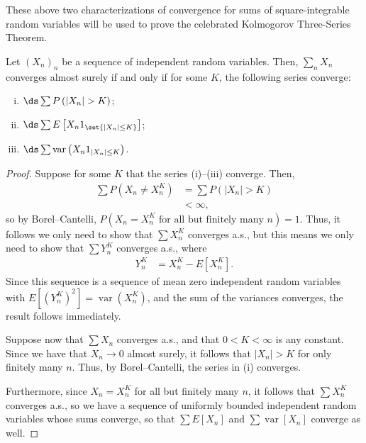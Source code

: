\documentclass[10pt]{mypackage}
\begin{document}
These above two characterizations of convergence for sums of square-integrable random variables will be used to prove the celebrated Kolmogorov Three-Series Theorem.
\begin{theorem}
  Let $\left( X_n \right)_{n}$ be a sequence of independent random variables. Then, $\sum_{n}X_n$ converges almost surely if and only if for some $K$, the following series converge:
  \begin{enumerate}[(i)]
    \item $\ds\sum P\left( \left\vert X_n \right\vert > K \right)$;
    \item $\ds\sum E\left[ X_n1_{\set{\left\vert X_n \right\vert \leq K}} \right]$;
    \item $\ds\sum \operatorname{var}\left( X_n1_{\left\vert X_n \right\vert\leq K} \right)$.
  \end{enumerate}
\end{theorem}
\begin{proof}
  Suppose for some $K$ that the series (i)--(iii) converge. Then,
  \begin{align*}
    \sum P\left( X_n\neq X_n^{K} \right) &= \sum P\left( \left\vert X_n \right\vert > K \right)\\
                                         &< \infty,
  \end{align*}
  so by Borel--Cantelli, $P\left( X_n = X_n^{K}\text{ for all but finitely many }n \right) = 1$. Thus, it follows we only need to show that $\sum X_n^K$ converges a.s., but this means we only need to show that $\sum Y_n^K$ converges a.s., where
  \begin{align*}
    Y_n^K &= X_n^K - E\left[ X_n^K \right].
  \end{align*}
  Since this sequence is a sequence of mean zero independent random variables with $E\left[ \left( Y_n^K \right)^2 \right] = \operatorname{var}\left( X_n^K \right)$, and the sum of the variances converges, the result follows immediately.

  Suppose now that $\sum X_n$ converges a.s., and that $0 < K < \infty$ is any constant. Since we have that $X_n\to 0$ almost surely, it follows that $\left\vert X_n \right\vert > K$ for only finitely many $n$. Thus, by Borel--Cantelli, the series in (i) converges.

  Furthermore, since $X_n = X_n^K$ for all but finitely many $n$, it follows that $\sum X_n^K$ converges a.s., so we have a sequence of uniformly bounded independent random variables whose sums converge, so that $\sum E\left[ X_n \right]$ and $\sum \operatorname{var}\left[ X_n \right]$ converge as well.
\end{proof}
\end{document}
